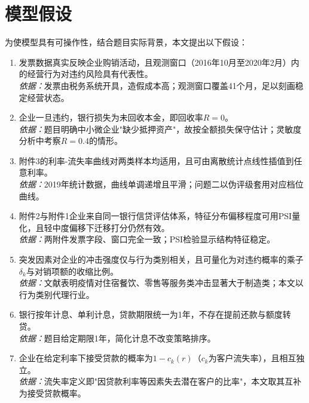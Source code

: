 \documentclass[12pt, a4paper]{article}
\begin{document}
\section{模型假设}

为使模型具有可操作性，结合题目实际背景，本文提出以下假设：

\begin{enumerate}[label=\textbf{假设\arabic*：}, leftmargin=*]
    \item 发票数据真实反映企业购销活动，且观测窗口（2016年10月至2020年2月）内的经营行为对违约风险具有代表性。\\
          \textit{依据：}发票由税务系统开具，造假成本高；观测窗口覆盖41个月，足以刻画稳定经营状态。

    \item 企业一旦违约，银行损失为未回收本金，即回收率$R=0$。\\
          \textit{依据：}题目明确中小微企业"缺少抵押资产"，故按全额损失保守估计；灵敏度分析中考察$R=0.4$的情形。

    \item 附件3的利率-流失率曲线对两类样本均适用，且可由离散统计点线性插值到任意利率。\\
          \textit{依据：}2019年统计数据，曲线单调递增且平滑；问题二以伪评级套用对应档位曲线。

    \item 附件2与附件1企业来自同一银行信贷评估体系，特征分布偏移程度可用PSI量化，且轻中度偏移下迁移打分仍然有效。\\
          \textit{依据：}两附件发票字段、窗口完全一致；PSI检验显示结构特征稳定。

    \item 突发因素对企业的冲击强度仅与行为类别相关，且可量化为对违约概率的乘子$\delta_k$与对销项额的收缩比例。\\
          \textit{依据：}文献表明疫情对住宿餐饮、零售等服务类冲击显著大于制造类；本文以行为类别代理行业。

    \item 银行按年计息、单利计息，贷款期限统一为1年，不存在提前还款与额度转贷。\\
          \textit{依据：}题目给定期限1年，简化计息不改变策略排序。

    \item 企业在给定利率下接受贷款的概率为$1-c_k(r)$（$c_k$为客户流失率），且相互独立。\\
          \textit{依据：}流失率定义即"因贷款利率等因素失去潜在客户的比率"，本文取其互补为接受贷款概率。
\end{enumerate}
\end{document}
